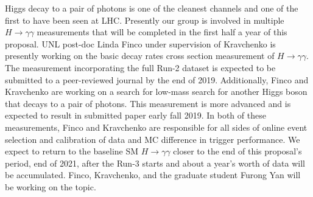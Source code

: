 Higgs decay to a pair of photons is one of the cleanest channels and one of the first to have been seen at LHC. Presently our group is involved in multiple $H\to\gamma\gamma$ measurements that will be completed in the first half a year of this proposal. UNL post-doc Linda Finco under supervision of Kravchenko is presently working on the basic decay rates cross section measurement of  $H\to\gamma\gamma$. The measurement incorporating the full Run-2 dataset is expected to be submitted to a peer-reviewed journal by the end of 2019. Additionally, Finco and Kravchenko are working on a search for low-mass search for another Higgs boson that decays to a pair of photons. This measurement is more advanced and is expected to result in submitted paper early fall 2019. In both of these measurements, Finco and Kravchenko are responsible for all sides of online event selection and calibration of data and MC difference in trigger performance. We expect to return to the baseline SM $H\to\gamma\gamma$ closer to the end of this proposal's period, end of 2021, after the Run-3 starts and about a year's worth of data will be accumulated. Finco, Kravchenko, and the graduate student Furong Yan will be working on the topic.

